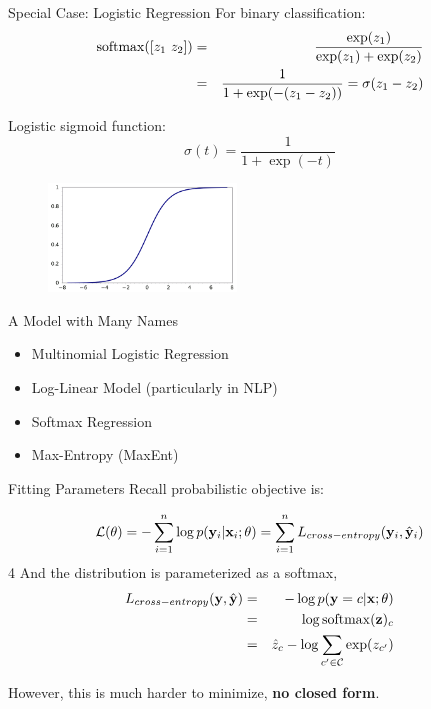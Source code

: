 \documentclass{beamer}
\begin{document}
\begin{frame}{Special Case: Logistic Regression}
  For binary classification:
  \begin{eqnarray*}
   \softmax([z_1\ z_2]) &=& \frac{\exp(z_1)}{\exp(z_1) + \exp(z_2)} \\
 &=& \frac{1}{1 + \exp(-(z_1-z_2))} = \sigma(z_1 -z_2)
  \end{eqnarray*}

  Logistic sigmoid function:
  \[\sigma(t) = \frac{1}{1 + \exp(-t)} \]
  \begin{figure}
    \centering
    \includegraphics[width=5cm]{sigmoid}
  \end{figure}
\end{frame}

\begin{frame}{A Model with Many Names}
  \begin{itemize}
  \item  Multinomial Logistic Regression

  \item Log-Linear Model (particularly in NLP)

  \item Softmax Regression

  \item Max-Entropy (MaxEnt)
  \end{itemize}
\end{frame}





\begin{frame}{Fitting Parameters}
  Recall probabilistic objective is:

  \[ \mathcal{L}(\theta) = - \sum_{i=1}^n \log p(\mathbf{y}_i | \mathbf{x}_i; \theta) = \sum_{i=1}^n L_{cross-entropy}(\mathbf{y}_i, \hat{\mathbf{y}}_i) \] 
4
  And the distribution is parameterized as a softmax,
  \begin{eqnarray*}
    L_{cross-entropy}(\boldy, \hat{\boldy}) &=& -\log p(\boldy=c | \boldx; \theta) \\
    &=& \log \softmax(\boldz)_c \\
    &=&\hat{z}_c - \log \sum_{c' \in \mcC} \exp(z_{c'}) 
  \end{eqnarray*}

  However, this is much harder to minimize, \textbf{no closed form}.
  
\end{frame}
\end{document}
